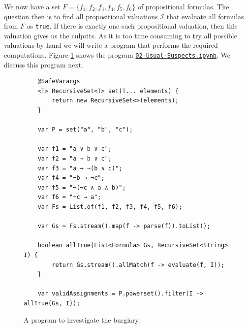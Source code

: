 We now have a set $F = \{ f_1, f_2, f_3, f_4, f_5, f_6 \}$ of propositional formulas.
The question then is to find all propositional valuations $\mathcal{I}$ that evaluate all formulas from $F$ as
\texttt{true}.  If there is exactly one such propositional valuation, then this valuation gives us the culprits.
As it is too time consuming to try all possible valuations by hand we will write a program that performs the
required computations.
Figure \ref{fig:Usual-Suspects.ipynb} shows the program
\href{https://github.com/karlstroetmann/Logic/blob/master/Java/Chapter-4/02-Usual-Suspects.ipynb}{\texttt{02-Usual-Suspects.ipynb}}.
We discuss this program next.

\begin{figure}[!ht]
  \centering
\begin{verbatim}
    @SafeVarargs
    <T> RecursiveSet<T> set(T... elements) {
        return new RecursiveSet<>(elements);
    }
    
    var P = set("a", "b", "c");
    
    var f1 = "a ∨ b ∨ c";
    var f2 = "a → b ∨ c";
    var f3 = "a → ¬(b ∧ c)";
    var f4 = "¬b → ¬c";
    var f5 = "¬(¬c ∧ a ∧ b)";
    var f6 = "¬c → a";
    var Fs = List.of(f1, f2, f3, f4, f5, f6);
    
    var Gs = Fs.stream().map(f -> parse(f)).toList();
        
    boolean allTrue(List<Formula> Gs, RecursiveSet<String> I) {
        return Gs.stream().allMatch(f -> evaluate(f, I));
    }
    
    var validAssignments = P.powerset().filter(I -> allTrue(Gs, I));
\end{verbatim}
\vspace*{-0.3cm}
  \caption{A program to investigate the burglary.}
  \label{fig:Usual-Suspects.ipynb}
\end{figure}

